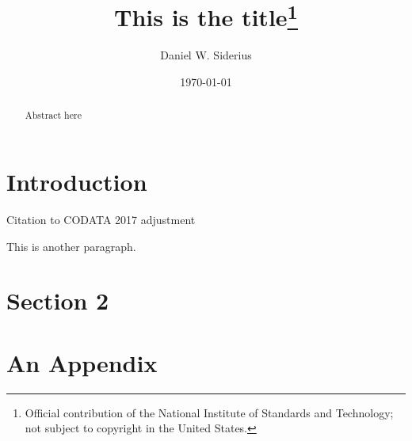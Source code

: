 \documentclass[preprint,pre,showkeys,12pt,superscriptaddress,nofootinbib]{revtex4-1}
\begin{document}
\title{This is the title\footnote{Official contribution of the National Institute of Standards and Technology; not subject to copyright in the United States.}} 


\author{Daniel W. Siderius}


\date{\today}

\begin{abstract}
Abstract here
\end{abstract}

\maketitle

\newpage
\section{Introduction}\label{sec:intro}
\lipsum[1]


Citation to CODATA 2017 adjustment\cite{Newell_CODATA_2017}

This is another paragraph.

\section{Section 2}
\lipsum[2]

\appendix
\section{An Appendix}




%
\end{document}
